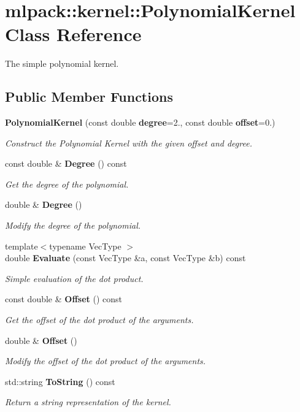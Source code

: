 \section{mlpack\-:\-:kernel\-:\-:Polynomial\-Kernel Class Reference}
\label{classmlpack_1_1kernel_1_1PolynomialKernel}


The simple polynomial kernel.  


\subsection*{Public Member Functions}
\begin{DoxyCompactItemize}
\item 
{\bf Polynomial\-Kernel} (const double {\bf degree}=2., const double {\bf offset}=0.)
\begin{DoxyCompactList}\small\item\em Construct the Polynomial Kernel with the given offset and degree. \end{DoxyCompactList}\item 
const double \& {\bf Degree} () const 
\begin{DoxyCompactList}\small\item\em Get the degree of the polynomial. \end{DoxyCompactList}\item 
double \& {\bf Degree} ()
\begin{DoxyCompactList}\small\item\em Modify the degree of the polynomial. \end{DoxyCompactList}\item 
{\footnotesize template$<$typename Vec\-Type $>$ }\\double {\bf Evaluate} (const Vec\-Type \&a, const Vec\-Type \&b) const 
\begin{DoxyCompactList}\small\item\em Simple evaluation of the dot product. \end{DoxyCompactList}\item 
const double \& {\bf Offset} () const 
\begin{DoxyCompactList}\small\item\em Get the offset of the dot product of the arguments. \end{DoxyCompactList}\item 
double \& {\bf Offset} ()
\begin{DoxyCompactList}\small\item\em Modify the offset of the dot product of the arguments. \end{DoxyCompactList}\item 
std\-::string {\bf To\-String} () const 
\begin{DoxyCompactList}\small\item\em Return a string representation of the kernel. \end{DoxyCompactList}\end{DoxyCompactItemize}

